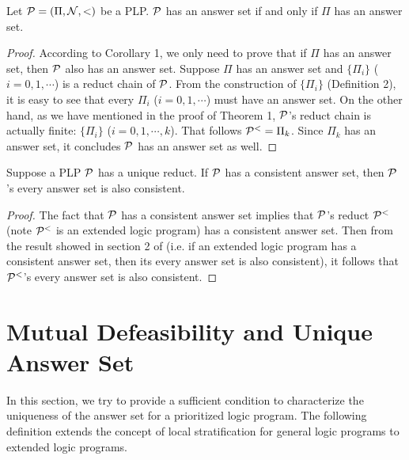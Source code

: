 \documentclass{tlp}
\begin{document}
\begin{theorem}
Let ${\cal P}=(\Pi,{\cal N},<)$ be a PLP.
${\cal P}$ has an answer set if and only if
$\Pi$ has an answer set.
\end{theorem}

\noindent   
\begin{proof}
According to Corollary 1, we only need to prove that if $\Pi$ has an
answer set, then ${\cal P}$ also has an answer set.
Suppose $\Pi$ has an answer set and $\{\Pi_i\}$ ($i=0,1,\cdots$) 
is a reduct chain of ${\cal P}$. From the construction of
$\{\Pi_i\}$ (Definition 2), it is easy to see that every 
$\Pi_i$ ($i=0,1,\cdots$) must have an answer set. On the other hand,
as we have mentioned
in the proof of Theorem 1, 
${\cal P}$'s reduct chain is actually finite: $\{\Pi_i\}$ ($i=0,1,\cdots, k$).
That follows ${\cal P}^{<}=\Pi_k$. Since $\Pi_k$ has an answer set, 
it concludes ${\cal P}$ has an answer set as well.
\end{proof} 
            
\begin{proposition}
Suppose a PLP ${\cal P}$ has a unique reduct. If
${\cal P}$ has a consistent answer set, then ${\cal P}$'s every answer
set is also consistent.
\end{proposition}

\noindent   
\begin{proof}
The fact that ${\cal P}$ has a consistent answer set implies that
${\cal P}$'s reduct ${\cal P}^{<}$ (note
${\cal P}^{<}$ is an extended logic program)
has a consistent answer set. Then from
the result showed in section 2 of \cite{lt:lp94}
(i.e. if an extended logic program has a consistent answer set, then its
every answer set is also consistent), it follows that
${\cal P}^{<}$'s every answer set is also consistent.
\end{proof} 
            
\section{Mutual Defeasibility and Unique Answer Set}

In this section, we try to provide a sufficient condition to 
characterize the uniqueness
of the answer set for a prioritized logic program.
The following definition extends the concept of local stratification for
general logic programs \cite{apt:94,ch:stra,lp:92} to extended logic programs.
\end{document}
